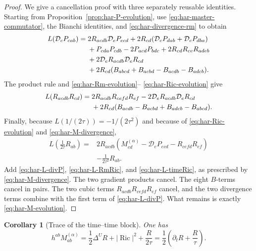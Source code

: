 \documentclass[10pt]{coll-l}
\newtheorem{corollary}[theorem]{Corollary}
\theoremstyle{definition}
\theoremstyle{remark}
\numberwithin{section}{chapter}
\numberwithin{equation}{chapter}
\newcommand{\Ric}{\operatorname{Ric}}
\begin{document}
\begin{proof}
We give a cancellation proof with three separately reusable identities.
Starting from Proposition~\ref{prop:har-P-evolution}, use
\eqref{eq:har-master-commutator}, the Bianchi identities, and
\eqref{eq:har-divergence-rm} to obtain
\begin{align}
 L(\mathcal D_cP_{cab})={}&
  2R_{acdb}\mathcal D_eP_{ecd}
 +2R_{cd}(\mathcal D_cP_{dab}+\mathcal D_cP_{dba})
 \notag\\
 &+P_{cda}P_{cdb}-2P_{acd}P_{bdc}
 +2R_{cd}R_{ce}R_{adeb}                                \notag\\
 &+2\mathcal D_eR_{acdb}\mathcal D_eR_{cd}              \notag\\
 &+2R_{cd}(B_{abcd}+B_{acbd}-B_{acdb}-B_{adcb}).         \label{eq:har-L-divP}
\end{align}
The product rule and \eqref{eq:har-Rm-evolution}--
\eqref{eq:har-Ric-evolution} give
\begin{align}
 L(R_{acdb}R_{cd})={}&
  2R_{acdb}R_{cefd}R_{ef}
 -2\mathcal D_eR_{acdb}\mathcal D_eR_{cd}               \notag\\
 &+2R_{cd}(B_{acdb}-B_{acbd}+B_{adcb}-B_{abcd}).         \label{eq:har-L-RmRic}
\end{align}
Finally, because $L(1/(2\tau))=-1/(2\tau^2)$ and because of
\eqref{eq:har-Ric-evolution} and \eqref{eq:har-M-divergence},
\begin{equation}
 \begin{split}
 L\!\left(\frac1{2\tau}R_{ab}\right)
  ={}&2R_{acdb}
      \left(M^{(\alpha)}_{cd}-\mathcal D_eP_{ecd}
                         -R_{cefd}R_{ef}\right)\\
    &-\frac1{2\tau^2}R_{ab}.                            \label{eq:har-L-timeRic}
 \end{split}
\end{equation}
Add \eqref{eq:har-L-divP}, \eqref{eq:har-L-RmRic}, and
\eqref{eq:har-L-timeRic}, as prescribed by
\eqref{eq:har-M-divergence}.  The two gradient products cancel.  The eight
$B$-terms cancel in pairs.  The two cubic terms
$R_{acdb}R_{cefd}R_{ef}$ cancel, and the two divergence terms combine with
the first term of \eqref{eq:har-L-divP}.  What remains is exactly
\eqref{eq:har-M-evolution}.
\end{proof}

\begin{corollary}[Trace of the time--time block]
\label{cor:har-trace-M}
One has
\begin{equation}
 h^{ab}M^{(\alpha)}_{ab}
 =\frac12\Delta^UR+|\Ric|^2+\frac{R}{2\tau}
 =\frac12\left(\partial_tR+\frac R\tau\right).          \label{eq:har-trace-M}
\end{equation}
\end{corollary}
\end{document}
